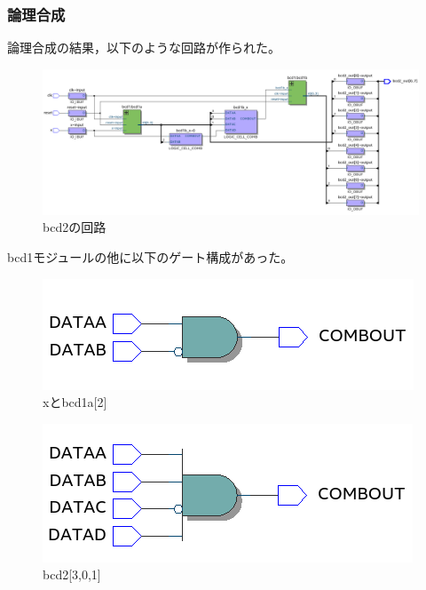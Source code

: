 \subsubsection{論理合成}
論理合成の結果，以下のような回路が作られた。

\begin{figure}[H]
  \centering
  \includegraphics[width=\linewidth]{./src/bcd/bcd2surc.png}
  \caption{bcd2の回路}
  \label{bcd2の回路0}
\end{figure}

bcd1モジュールの他に以下のゲート構成があった。

\begin{figure}[H]
  \centering
  \includegraphics[width=\linewidth]{./src/bcd/bcd2-2x.png}
  \caption{xとbcd1a[2]}
  \label{bcd2の回路1}
\end{figure}

\begin{figure}[H]
  \centering
  \includegraphics[width=\linewidth]{./src/bcd/bcd2031.png}
  \caption{bcd2[3,0,1]}
  \label{bcd2の回路2}
\end{figure}

